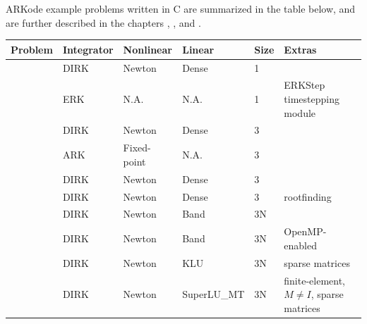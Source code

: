 \documentclass[letterpaper,10pt,english]{sphinxmanual}
\begin{document}
ARKode example problems written in C are summarized in the table
below, and are further described in the chapters {\hyperref[c_serial:serial-c]{\emph{}}},
{\hyperref[c_openmp:openmp-c]{\emph{}}}, {\hyperref[c_parallel:parallel-c]{\emph{}}} and {\hyperref[c_parhyp:parhyp-c]{\emph{}}}.

\begin{tabulary}{\linewidth}{|L|L|L|L|L|L|}
\hline
\textsf{\relax 
Problem
} & \textsf{\relax 
Integrator
} & \textsf{\relax 
Nonlinear
} & \textsf{\relax 
Linear
} & \textsf{\relax 
Size
} & \textsf{\relax 
Extras
}\\
\hline
{\hyperref[c_serial:ark-analytic]{\emph{}}}
 & 
DIRK
 & 
Newton
 & 
Dense
 & 
1
 & \\
\hline
{\hyperref[c_serial:ark-analytic-nonlin]{\emph{}}}
 & 
ERK
 & 
N.A.
 & 
N.A.
 & 
1
 & 
ERKStep timestepping module
\\
\hline
{\hyperref[c_serial:ark-brusselator]{\emph{}}}
 & 
DIRK
 & 
Newton
 & 
Dense
 & 
3
 & \\
\hline
{\hyperref[c_serial:ark-brusselator-fp]{\emph{}}}
 & 
ARK
 & 
Fixed-point
 & 
N.A.
 & 
3
 & \\
\hline
{\hyperref[c_serial:ark-robertson]{\emph{}}}
 & 
DIRK
 & 
Newton
 & 
Dense
 & 
3
 & \\
\hline
{\hyperref[c_serial:ark-robertson-root]{\emph{}}}
 & 
DIRK
 & 
Newton
 & 
Dense
 & 
3
 & 
rootfinding
\\
\hline
{\hyperref[c_serial:ark-brusselator1d]{\emph{}}}
 & 
DIRK
 & 
Newton
 & 
Band
 & 
3N
 & \\
\hline
{\hyperref[c_openmp:ark-brusselator1d-omp]{\emph{}}}
 & 
DIRK
 & 
Newton
 & 
Band
 & 
3N
 & 
OpenMP-enabled
\\
\hline
{\hyperref[c_serial:ark-brusselator1d-klu]{\emph{}}}
 & 
DIRK
 & 
Newton
 & 
KLU
 & 
3N
 & 
sparse matrices
\\
\hline
{\hyperref[c_serial:ark-brusselator1d-fem-slu]{\emph{}}}
 & 
DIRK
 & 
Newton
 & 
SuperLU\_MT
 & 
3N
 & 
finite-element, \(M\ne I\), sparse matrices
\\
\hline

\end{tabulary}
\end{document}
